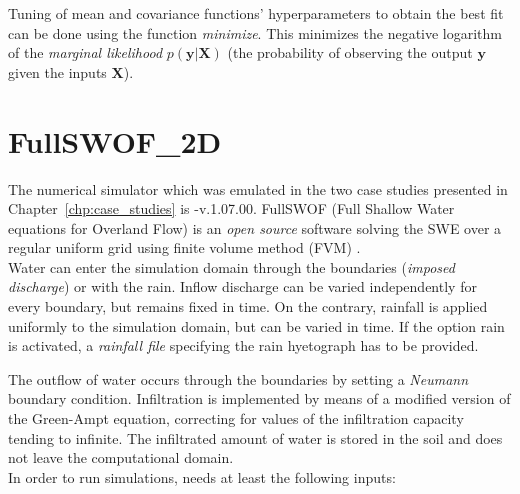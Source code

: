 Tuning of mean and covariance functions' hyperparameters to obtain the best fit can be done using the function \emph{minimize}. This minimizes the negative logarithm of the \emph{marginal likelihood} $p(\bm{y}\vert \bm{X})$ (the probability of observing the output $\bm{y}$ given the inputs $\bm{X}$).
 
\section{FullSWOF\_2D}\label{sec:simulator}

The numerical simulator which was emulated in the two case studies presented in Chapter~\ref{chp:case_studies} is -v.1.07.00. FullSWOF (Full Shallow Water equations for Overland Flow) is an \emph{open source} software solving the SWE over a regular uniform grid using finite volume method (FVM) \autocite{the_fullswof_team_fullswof_2018}.\\
 
Water can enter the simulation domain through the boundaries (\emph{imposed discharge}) or with the rain.
Inflow discharge can be varied independently for every boundary, but remains fixed in time.
On the contrary, rainfall is applied uniformly to the simulation domain, but can be varied in time. If the option rain is activated, a \emph{rainfall file} specifying the rain hyetograph has to be provided.

The outflow of water occurs through the boundaries by setting a \emph{Neumann} boundary condition.
Infiltration is implemented by means of a modified version of the Green-Ampt equation, correcting for values of the infiltration capacity tending to infinite.
The infiltrated amount of water is stored in the soil and does not leave the computational domain.\\

\noindent In order to run simulations,  needs at least the following inputs:

